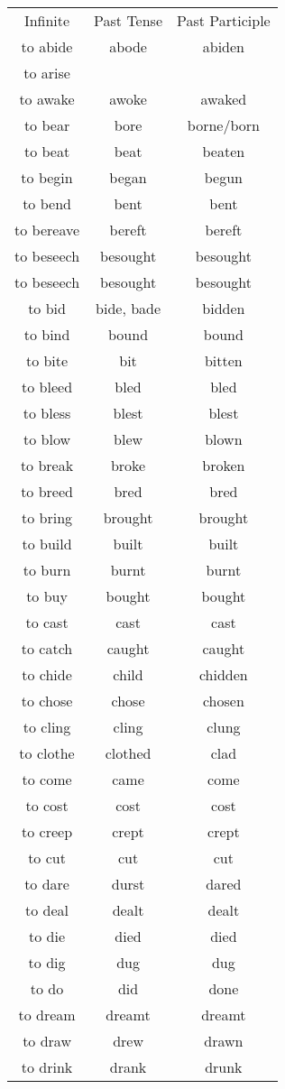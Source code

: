 \documentclass[a4paper, titlepage]{article}
\begin{document}
\begin{tabular}{ccc}
Infinite&Past Tense& Past Participle\\
to abide&abode&abiden\\
to arise&&\\
to awake&awoke&awaked\\
to bear&bore&borne/born\\
to beat&beat&beaten\\
to begin&began&begun\\
to bend&bent&bent\\
to bereave&bereft&bereft\\
to beseech&besought&besought\\
to beseech&besought&besought\\
to bid&bide, bade&bidden\\
to bind&bound&bound\\
to bite&bit&bitten\\
to bleed&bled&bled\\
to bless&blest&blest\\
to blow&blew&blown\\
to break&broke&broken\\
to breed&bred&bred\\
to bring&brought&brought\\
to build&built&built\\
to burn&burnt&burnt\\
to buy&bought&bought\\
to cast&cast&cast\\
to catch&caught&caught\\
to chide&child&chidden\\
to chose&chose&chosen\\
to cling&cling&clung\\
to clothe&clothed&clad\\
to come&came&come\\
to cost&cost&cost\\
to creep&crept&crept\\
to cut&cut&cut\\
to dare&durst&dared\\
to deal&dealt&dealt\\
to die&died&died\\
to dig&dug&dug\\
to do&did&done\\
to dream&dreamt&dreamt\\
to draw&drew&drawn\\
to drink&drank&drunk\\

\end{tabular}
\end{document}

